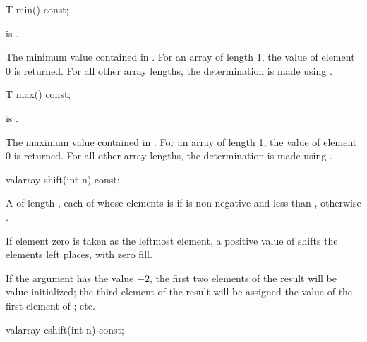 %
\begin{itemdecl}
T min() const;
\end{itemdecl}

\begin{itemdescr}
\pnum
\expects
{} is .

\pnum
\returns
The minimum value contained in .
For an array of length 1, the value of element 0 is returned.
For all other array
lengths, the determination is made using
.
\end{itemdescr}

%
\begin{itemdecl}
T max() const;
\end{itemdecl}

\begin{itemdescr}
\pnum
\expects
{} is .

\pnum
\returns
The maximum value contained in .
For an array of length 1, the value of element 0 is returned.
For all other array
lengths, the determination is made using
.
\end{itemdescr}

%
\begin{itemdecl}
valarray shift(int n) const;
\end{itemdecl}

\begin{itemdescr}
\pnum
\returns
A  of length , each of whose elements
 is
if 
is non-negative and less than
, otherwise .
\begin{note}
If element zero is taken as the leftmost element,
a positive value of  shifts the elements left 
places, with zero fill.
\end{note}

\pnum
\begin{example}
If the argument has the value $-2$,
the first two elements of the result will be value-initialized; the third element of the result will be assigned the value
of the first element of ; etc.
\end{example}
\end{itemdescr}

%
\begin{itemdecl}
valarray cshift(int n) const;
\end{itemdecl}

